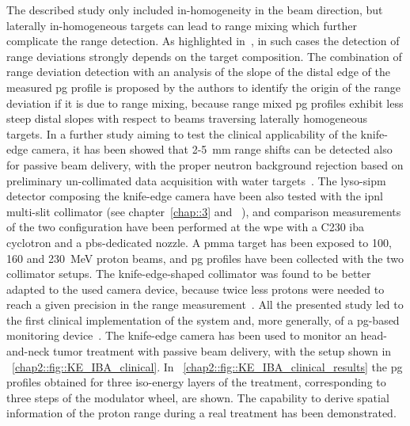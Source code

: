 The described study only included in-homogeneity in the beam direction, but laterally in-homogeneous targets can lead to range mixing which further complicate the range detection. As highlighted in~\cite{Priegnitz2016}, in such cases the detection of range deviations strongly depends on the target composition. The combination of range deviation detection with an analysis of the slope of the distal edge of the measured \gls{pg} profile is proposed by the authors to identify the origin of the range deviation if it is due to range mixing, because range mixed \gls{pg} profiles exhibit less steep distal slopes with respect to beams traversing laterally homogeneous targets. In a further study aiming to test the clinical applicability of the knife-edge camera, it has been showed that 2-5~mm range shifts can be detected also for passive beam delivery, with the proper neutron background rejection based on preliminary un-collimated data acquisition with water targets~\parencite{Priegnitz2016}. The \gls{lyso}-\gls{sipm} detector composing the knife-edge camera have been also tested with the \gls{ipnl} multi-slit collimator (see chapter~\ref{chap::3} and ~\cite{Pinto2014}), and comparison measurements of the two configuration have been performed at the \gls{wpe} with a C230 \gls{iba} cyclotron and a \gls{pbs}-dedicated nozzle. A \gls{pmma} target has been exposed to 100, 160 and 230~MeV proton beams, and \gls{pg} profiles have been collected with the two collimator setups. The knife-edge-shaped collimator was found to be better adapted to the used camera device, because twice less protons were needed to reach a given precision in the range measurement~\parencite{Smeets2016}.
All the presented study led to the first clinical implementation of the system and, more generally, of a \gls{pg}-based monitoring device~\parencite{Richter2016}. The knife-edge camera has been used to monitor an head-and-neck tumor treatment with passive beam delivery, with the setup shown in \figurename~\ref{chap2::fig::KE_IBA_clinical}. In \figurename~\ref{chap2::fig::KE_IBA_clinical_results} the \gls{pg} profiles obtained for three iso-energy layers of the treatment, corresponding to three steps of the modulator wheel, are shown. The capability to derive spatial information of the proton range during a real treatment has been demonstrated.

